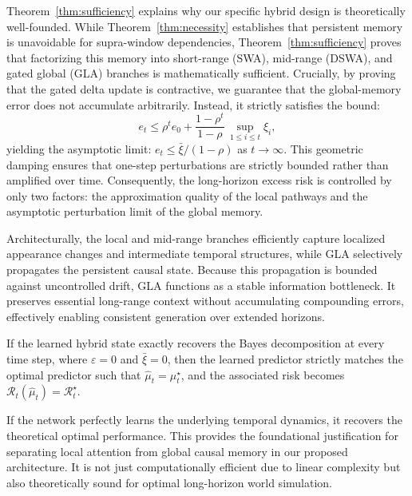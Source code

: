 \begin{remark}
\normalfont Theorem~\ref{thm:sufficiency} explains why our specific hybrid design is theoretically well-founded. While Theorem~\ref{thm:necessity} establishes that persistent memory is unavoidable for supra-window dependencies, Theorem~\ref{thm:sufficiency} proves that factorizing this memory into short-range (\textsc{SWA}), mid-range (\textsc{DSWA}), and gated global (\textsc{GLA}) branches is mathematically sufficient. Crucially, by proving that the gated delta update is contractive, we guarantee that the global-memory error does not accumulate arbitrarily. Instead, it strictly satisfies the bound:
\[
e_t \le \rho^t e_0 + \frac{1-\rho^t}{1-\rho}\, \sup_{1\le i\le t}\xi_i,
\]
yielding the asymptotic limit: $e_t \le \bar\xi/(1-\rho)$ as  $t\to\infty.$ This geometric damping ensures that one-step perturbations are strictly bounded rather than amplified over time. Consequently, the long-horizon excess risk is controlled by only two factors: the approximation quality of the local pathways and the asymptotic perturbation limit of the global memory.

Architecturally, the local and mid-range branches efficiently capture localized appearance changes and intermediate temporal structures, while \textsc{GLA} selectively propagates the persistent causal state. Because this propagation is bounded against uncontrolled drift, \textsc{GLA} functions as a stable information bottleneck. It preserves essential long-range context without accumulating compounding errors, effectively enabling consistent generation over extended horizons.
\end{remark}

\begin{corollary}
\label{cor:exact_sufficiency}
If the learned hybrid state exactly recovers the Bayes decomposition at every time step, where $\varepsilon=0$ and $\bar{\xi}=0$, then the learned predictor strictly matches the optimal predictor such that $\hat{\mu}_t = \mu_t^\star$, and the associated risk becomes $\mathcal{R}_t(\hat{\mu}_t) = \mathcal{R}_t^\star$.
\end{corollary}

\begin{remark}
\normalfont If the network perfectly learns the underlying temporal dynamics, it recovers the theoretical optimal performance. This provides the foundational justification for separating local attention from global causal memory in our proposed architecture. It is not just computationally efficient due to linear complexity but also theoretically sound for optimal long-horizon world simulation.
\end{remark}

